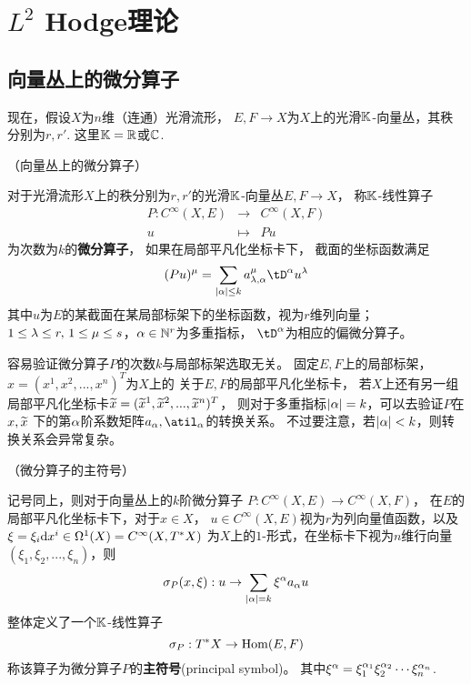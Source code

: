 \chapter{$L^2$ Hodge理论}

\section{向量丛上的微分算子}

现在，假设$X$为$n$维（连通）光滑流形，
$E,F\to X$为$X$上的光滑$\mathbb{K}$-向量丛，其秩分别为$r,r'$.
这里$\mathbb{K}=\mathbb{R}$或$\mathbb{C}$.

\begin{definition}（向量丛上的微分算子）

对于光滑流形$X$上的秩分别为$r,r'$的光滑$\mathbb{K}$-向量丛$E,F\to X$，
称$\mathbb{K}$-线性算子
\begin{eqnarray*}
  P: C^\infty(X,E)&\to& C^\infty(X,F)\\
  u&\mapsto& Pu
\end{eqnarray*}
为次数为$k$的\textbf{微分算子}，
如果在局部平凡化坐标卡下，
截面的坐标函数满足
$$
  (Pu)^\mu
= \sum_{|\afa|\leq k}
  a^\mu_{\lmd,\afa}\tD^\afa u^\lmd
$$
其中$u$为$E$的某截面在某局部标架下的坐标函数，视为$r$维列向量；
$1\leq\lambda\leq r,\,1\leq\mu\leq s$，$\alpha\in\mathbb{N}^r$为多重指标，
$\tD^\afa$为相应的偏微分算子。
\end{definition}

容易验证微分算子$P$的次数$k$与局部标架选取无关。
固定$E,F$上的局部标架，$x=(x^1,x^2,...,x^n)^T$为$X$上的
关于$E,F$的局部平凡化坐标卡，
若$X$上还有另一组局部平凡化坐标卡$\widetilde{x}=(\widetilde{x}^1,\widetilde{x}^2,...,\widetilde{x}^n)^T$，
则对于多重指标$|\alpha|=k$，可以去验证$P$在$x,\widetilde{x}$
下的第$\alpha$阶系数矩阵$a_\afa,\atil_\afa$的转换关系。
不过要注意，若$|\alpha|<k$，则转换关系会异常复杂。


\begin{prop}（微分算子的主符号）

记号同上，则对于向量丛上的$k$阶微分算子
$P:C^\infty(X,E)\to C^\infty(X,F)$，
在$E$的局部平凡化坐标卡下，对于$x\in X$，
$u\in C^\infty(X,E)$视为$r$为列向量值函数，以及
$\xi=\xi_i\mathrm{d} x^i\in\Omega^1(X)=C^\infty(X,T^*X)$
为$X$上的$1$-形式，在坐标卡下视为$n$维行向量$(\xi_1,\xi_2,...,\xi_n)$，则
$$
  \sigma_P(x,\xi):u
  \to\sum_{|\alpha|=k}
    \xi^\alpha a_\alpha u
$$
整体定义了一个$\mathbb{K}$-线性算子
$$\sigma_P:T^*X\to\operatorname{Hom}(E,F)$$
称该算子为微分算子$P$的\textbf{主符号}(principal symbol)。
其中$\xi^\alpha=\xi_1^{\alpha_1}\xi_2^{\alpha_2}\cdots\xi_n^{\alpha_n}$.
\end{prop}

